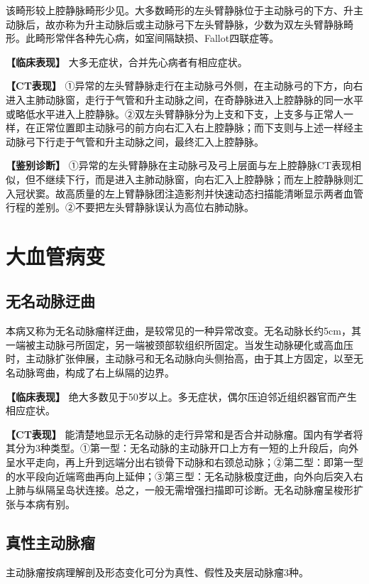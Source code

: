 该畸形较上腔静脉畸形少见。大多数畸形的左头臂静脉位于主动脉弓的下方、升主动脉后，故亦称为升主动脉后或主动脉弓下左头臂静脉，少数为双左头臂静脉畸形。此畸形常伴各种先心病，如室间隔缺损、Fallot四联症等。

\textbf{【临床表现】} 大多无症状，合并先心病者有相应症状。

\textbf{【CT表现】}
①异常的左头臂静脉走行在主动脉弓外侧，在主动脉弓的下方，向右进入主肺动脉窗，走行于气管和升主动脉之间，在奇静脉进入上腔静脉的同一水平或略低水平进入上腔静脉。②双左头臂静脉分为上支和下支，上支多与正常人一样，在正常位置即主动脉弓的前方向右汇入右上腔静脉；而下支则与上述一样经主动脉弓下行走于气管和升主动脉之间，最终汇入上腔静脉。

\textbf{【鉴别诊断】}
①异常的左头臂静脉在主动脉弓及弓上层面与左上腔静脉CT表现相似，但不继续下行，而是进入主肺动脉窗，向右汇入上腔静脉；而左上腔静脉则汇入冠状窦。故高质量的左上臂静脉团注造影剂并快速动态扫描能清晰显示两者血管行程的差别。②不要把左头臂静脉误认为高位右肺动脉。

\section{大血管病变}

\subsection{无名动脉迂曲}

本病又称为无名动脉瘤样迂曲，是较常见的一种异常改变。无名动脉长约5cm，其一端被主动脉弓所固定，另一端被颈部软组织所固定。当发生动脉硬化或高血压时，主动脉扩张伸展，主动脉弓和无名动脉向头侧抬高，由于其上方固定，以至无名动脉弯曲，构成了右上纵隔的边界。

\textbf{【临床表现】}
绝大多数见于50岁以上。多无症状，偶尔压迫邻近组织器官而产生相应症状。

\textbf{【CT表现】}
能清楚地显示无名动脉的走行异常和是否合并动脉瘤。国内有学者将其分为3种类型。①第一型：无名动脉的主动脉开口上方有一短的上升段后，向外呈水平走向，再上升到远端分出右锁骨下动脉和右颈总动脉；②第二型：即第一型的水平段向近端弯曲再向上延伸；③第三型：无名动脉极度迂曲，向外向后突入右上肺与纵隔呈岛状连接。总之，一般无需增强扫描即可诊断。无名动脉瘤呈梭形扩张与本病有别。

\subsection{真性主动脉瘤}

主动脉瘤按病理解剖及形态变化可分为真性、假性及夹层动脉瘤3种。

